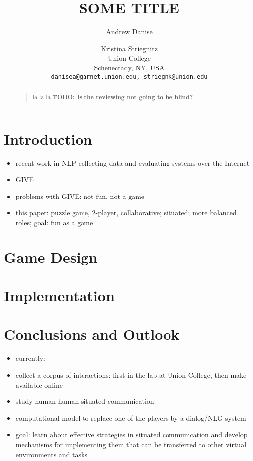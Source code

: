 \documentclass[letterpaper]{article}
\newcommand{\todo}[1]{\textbf{TODO: #1}}
\begin{document}
%
\title{SOME TITLE}
\author{
Andrew Danise \and Kristina Striegnitz\\
Union College\\
Schenectady, NY, USA\\
\texttt{danisea@garnet.union.edu, striegnk@union.edu}
}
\maketitle
\begin{abstract}
\begin{quote}
la la la \todo{Is the reviewing not going to be blind?}
\end{quote}
\end{abstract}


\section{Introduction}

\begin{itemize}
\item recent work in NLP collecting data and evaluating
  systems over the Internet
\item GIVE \cite{koller-etal-2010-give1-book,striegnitz-etal-2011-give25}
\item problems with GIVE: not fun, not a game
\item this paper: puzzle game, 2-player, collaborative; situated; more
  balanced roles; goal: fun as a game
\end{itemize}

\section{Game Design}

\section{Implementation}

\section{Conclusions and Outlook}

\begin{itemize}
\item currently:
\item collect a corpus of interactions: first in the lab at Union
  College, then make available online
\item study human-human situated communication
\item computational model to replace one of the players by a
  dialog/NLG system
\item goal: learn about effective strategies in situated communication
  and develop mechanisms for implementing them that can be transferred
  to other virtual environments and tasks
\end{itemize}



\end{document}
